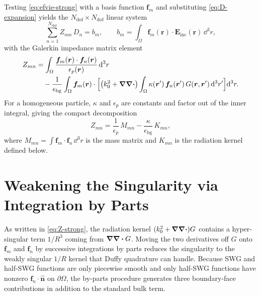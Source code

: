 \documentclass[11pt,a4paper]{article}
\begin{document}
Testing \eqref{eq:efvie-strong} with a basis function $\bm{f}_m$ and
substituting \eqref{eq:D-expansion} yields the $N_{\text{dof}} \times
N_{\text{dof}}$ linear system
\begin{equation}
  \sum_{n=1}^{N_{\text{dof}}} Z_{mn}\,D_n = b_m,
  \qquad
  b_m = \int_{\Omega} \bm{f}_m(\bm{r})\cdot\bm{E}_{\text{inc}}(\bm{r})\,\dd^{3}r,
  \label{eq:linear-system}
\end{equation}
with the Galerkin impedance matrix element
\begin{equation}
\begin{aligned}
  Z_{mn}
    &= \int_{\Omega}
         \frac{\bm{f}_m(\bm{r})\cdot\bm{f}_n(\bm{r})}{\epsilon_p(\bm{r})}\,
         \dd^{3}r \\
    &\quad- \frac{1}{\epsilon_{\text{bg}}}
       \int_{\Omega}\bm{f}_m(\bm{r})\cdot
         \Bigl[
           \bigl(k_0^{2} + \grad\div\bigr)
           \int_{\Omega}\kappa(\bm{r}')\,\bm{f}_n(\bm{r}')\,
                        G(\bm{r},\bm{r}')\,\dd^{3}r'
         \Bigr]\dd^{3}r.
\end{aligned}
  \label{eq:Z-strong}
\end{equation}
For a homogeneous particle, $\kappa$ and $\epsilon_p$ are constants and
factor out of the inner integral, giving the compact decomposition
\begin{equation}
  Z_{mn} = \frac{1}{\epsilon_p}\,M_{mn}
           - \frac{\kappa}{\epsilon_{\text{bg}}}\,K_{mn},
  \label{eq:Z-decomposition}
\end{equation}
where $M_{mn} = \int \bm{f}_m\!\cdot\!\bm{f}_n\,\dd^{3}r$ is the mass
matrix and $K_{mn}$ is the radiation kernel defined below.

\section{Weakening the Singularity via Integration by Parts}
\label{sec:weakening}

As written in \eqref{eq:Z-strong}, the radiation kernel
$(k_0^{2}+\grad\div) G$ contains a hyper-singular term $1/R^{3}$ coming
from $\grad\div G$. Moving the two derivatives off $G$ onto
$\bm{f}_m$ and $\bm{f}_n$ by successive integrations by parts reduces
the singularity to the weakly singular $1/R$ kernel that Duffy
quadrature can handle. Because SWG and half-SWG functions are only
piecewise smooth and only half-SWG functions have nonzero
$\bm{f}_n\!\cdot\!\hat{\bm{n}}$ on $\partial\Omega$, the by-parts
procedure generates three boundary-face contributions in addition to
the standard bulk term.
\end{document}
